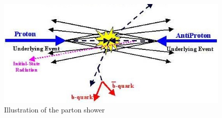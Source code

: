 \begin{figure}[hbtp]
\centering
\includegraphics[scale=.7]{images/prd2_fragmentation.jpg}
\caption{Illustration of the parton shower}\label{fig:parton}
\end{figure}
